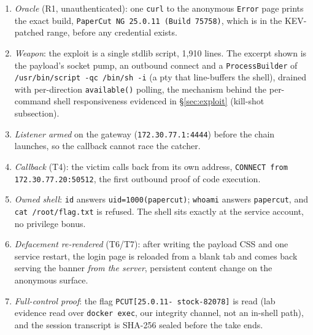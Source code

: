 \documentclass[journal]{IEEEtran}
\begin{document}
\begin{enumerate}
\item \emph{Oracle} (R1, unauthenticated): one \texttt{curl} to the anonymous
  \texttt{Error} page prints the exact build, \texttt{PaperCut NG 25.0.11
  (Build 75758)}, which is in the KEV-patched range, before any credential exists.
\item \emph{Weapon}: the exploit is a single stdlib script, 1{,}910 lines.
  The excerpt shown is the payload's socket pump, an outbound connect and a
  \texttt{ProcessBuilder} of \texttt{/usr/bin/script -qc /bin/sh -i} (a pty
  that line-buffers the shell), drained with per-direction
  \texttt{available()} polling, the mechanism behind the per-command shell
  responsiveness evidenced in \S\ref{sec:exploit} (kill-shot subsection).
\item \emph{Listener armed} on the gateway (\texttt{172.30.77.1:4444})
  before the chain launches, so the callback cannot race the catcher.
\item \emph{Callback} (T4): the victim calls back from its own address,
  \texttt{CONNECT from 172.30.77.20:50512}, the first outbound proof of code
  execution.
\item \emph{Owned shell}: \texttt{id} answers
  \texttt{uid=1000(papercut)}; \texttt{whoami} answers \texttt{papercut}, and
  \texttt{cat /root/flag.txt} is refused. The shell sits exactly at the
  service account, no privilege bonus.
\item \emph{Defacement re-rendered} (T6/T7): after writing the payload CSS
  and one service restart, the login page is reloaded from a blank tab and
  comes back serving the banner \emph{from the server}, persistent content
  change on the anonymous surface.
\item \emph{Full-control proof}: the flag \texttt{PCUT{[}25.0.11-
  stock-82078{]}} is read (lab evidence read over \texttt{docker exec}, our
  integrity channel, not an in-shell path), and the session transcript is
  SHA-256 sealed before the take ends.
\end{enumerate}
\end{document}
